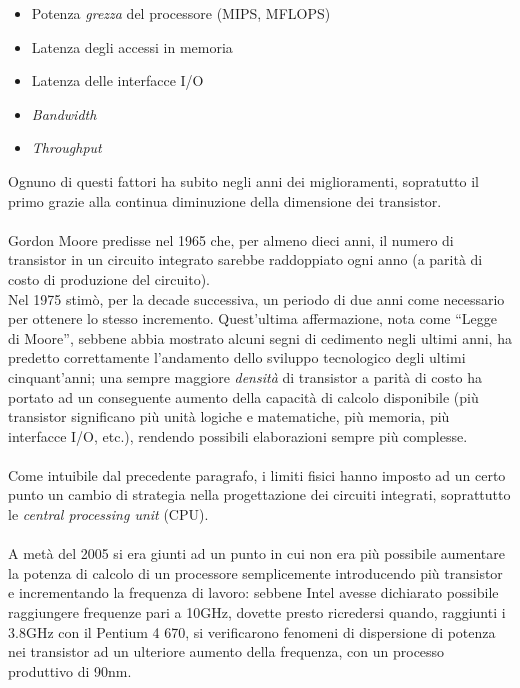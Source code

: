 \begin{itemize}
\item Potenza \emph{grezza} del processore (MIPS, MFLOPS)
\item Latenza degli accessi in memoria
\item Latenza delle interfacce I/O
\item \textit{Bandwidth}
\item \textit{Throughput}
\end{itemize}
Ognuno di questi fattori ha subito negli anni dei miglioramenti, sopratutto il
primo grazie alla continua diminuzione della dimensione dei transistor. 
\\ \\
Gordon Moore predisse nel 1965\citep{GMoore} che, 
per almeno dieci anni, il numero di transistor in un circuito integrato 
sarebbe raddoppiato ogni anno (a parità di costo di produzione del circuito). \\
Nel 1975 stimò, per la decade successiva, un periodo di due anni come 
necessario per ottenere lo stesso incremento. Quest'ultima affermazione, 
nota come ``Legge di Moore'', sebbene abbia mostrato alcuni segni di
cedimento negli ultimi anni\citep{MooresLaw}, ha 
predetto correttamente l'andamento dello sviluppo tecnologico degli ultimi
cinquant'anni; una sempre maggiore \emph{densità} di transistor a parità
di costo ha portato ad un conseguente aumento della capacità di calcolo 
disponibile (più transistor significano più unità logiche e matematiche,
più memoria, più interfacce I/O, etc.), rendendo possibili elaborazioni
sempre più complesse. 
\\ \\
Come intuibile dal precedente paragrafo, i limiti fisici hanno imposto ad un 
certo punto un cambio di strategia nella progettazione dei circuiti integrati,
soprattutto le \emph{central processing unit} (CPU).
\\ \\
A metà del 2005 si era giunti ad un punto in cui non era più possibile 
aumentare la potenza di calcolo di un processore semplicemente introducendo
più transistor e incrementando la frequenza di lavoro: sebbene Intel avesse 
dichiarato possibile raggiungere frequenze pari a 10GHz, dovette presto 
ricredersi quando, raggiunti i 3.8GHz con il Pentium 4 670, si verificarono 
fenomeni di dispersione di potenza nei transistor ad un ulteriore aumento della 
frequenza, con un processo produttivo di 90nm. \\
